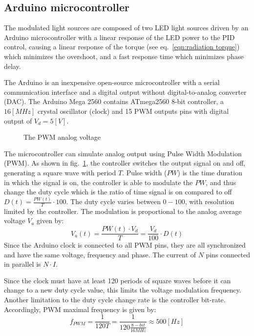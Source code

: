 \documentclass[\main/master.tex]{subfiles}
\begin{document}
\subsection{Arduino microcontroller}
The modulated light sources are composed of two LED light sources driven by an Arduino microcontroller with a linear response of the LED power to the PID control, causing a linear response of the torque (see eq.~\ref{eqn:radiation torque}) which minimizes the overshoot, and a fast response time which minimizes phase delay.
\par\noindent
The Arduino is an inexpensive open-source microcontroller with a serial communication interface and a digital output without digital-to-analog converter (DAC). The Arduino Mega 2560 contains ATmega2560 8-bit controller, a $16 [MHz]$ crystal oscillator (clock) and 15 PWM outputs pins with digital output of $V_d = 5[V]$.
\begin{figure}[htbp]
	\centering
	\caption[The PWM analog voltage]{The PWM analog voltage}
	\label{fig:duty_cycle}
\end{figure}
\FloatBarrier
\par\noindent
The microcontroller can simulate analog output using Pulse Width Modulation (PWM). As shown in fig.~\ref{fig:duty_cycle}, the controller switches the output signal on and off, generating a square wave with period $T$. Pulse width ($PW$) is the time duration in which the signal is on, the controller is able to modulate the $PW$, and thus change the duty cycle which is the ratio of time signal is on compared to off $D(t) = \frac{PW(t)}{T}\cdot 100$. The duty cycle varies between $0-100$, with resolution limited by the controller. The modulation is proportional to the analog average voltage $V_a$ given by: 
\begin{equation}
V_a(t) = \frac{ PW(t)\cdot V_d}{ T}  = \frac{V_d}{100}\cdot D(t)   \label{eqn:pwm voltage}
\end{equation}
Since the Arduino clock is connected to all PWM pins, they are all synchronized and have the same voltage, frequency and phase. The current of $N$ pins connected in parallel is $N\cdot I$.
\par\noindent
Since the clock must have at least 120 periods of square waves before it can change to a new duty cycle value, this limits the voltage modulation frequency. Another limitation to the duty cycle change rate is the controller bit-rate. Accordingly, PWM maximal frequency is given by:
\begin{equation}
f_{PWM} = \frac{1 }{120T}= \frac{1 }{120 \frac{8-bit }{16MHz}}  \approx 500[Hz]	    \label{eqn:pwm frequency}
\end{equation}
\end{document}
